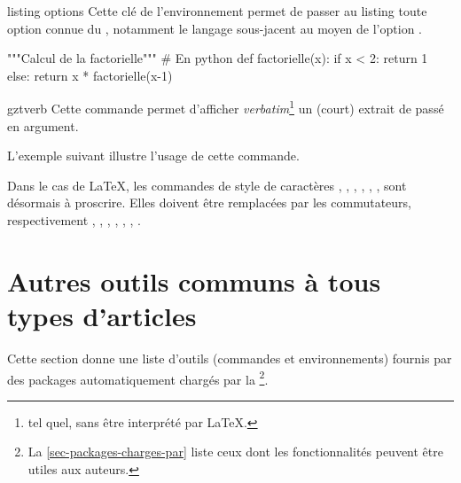 \begin{docKey}{listing options}{}{}
  Cette clé de l'environnement  permet de passer au listing
  toute option connue du , notamment le langage sous-jacent
  au moyen de l'option .
\begin{bodycode}
%
\begin{gztcode}[listing options={style=mon-style}]
"""Calcul de la factorielle""" # En python
def factorielle(x):
  if x < 2:
    return 1
  else:
    return x * factorielle(x-1)
\end{gztcode}
\end{bodycode}
\lstset{escapechar="}
\end{docKey}

\begin{docCommand}{gztverb}{}
  Cette commande permet d'afficher \emph{verbatim}\footnote{\Cad*{} tel quel,
    sans être interprété par \LaTeX{}.} un (court) extrait de  passé en
  argument.

  L'exemple suivant illustre l'usage de cette commande\conseilslatex.
\begin{bodycode}[listing and text,colback=white,listing options={deletekeywords={listing},deletekeywords={[3]style}}]
Dans le cas de \LaTeX, les commandes de style de caractères \gztverb{\bf},
\gztverb{\it}, \gztverb{\sf}, \gztverb{\tt}, \gztverb{\sc}, \gztverb{\sl},
\gztverb{\rm} sont désormais à proscrire. Elles doivent être remplacées par
les commutateurs, respectivement \gztverb{\bfseries}, \gztverb{\itshape},
\gztverb{\sffamily}, \gztverb{\ttfamily}, \gztverb{\scshape},
\gztverb{\slshape}, \gztverb{\rmfamily}.
\end{bodycode}
\end{docCommand}

\section{Autres outils communs à tous types d'articles}
\label{sec-outils-communs-tous-1}

Cette section donne une liste d'outils (commandes et environnements) fournis par
des packages automatiquement chargés par la \gztauthorcl\footnote{La
  \vref{sec-packages-charges-par} liste ceux dont les fonctionnalités peuvent
  être utiles aux auteurs.}.


